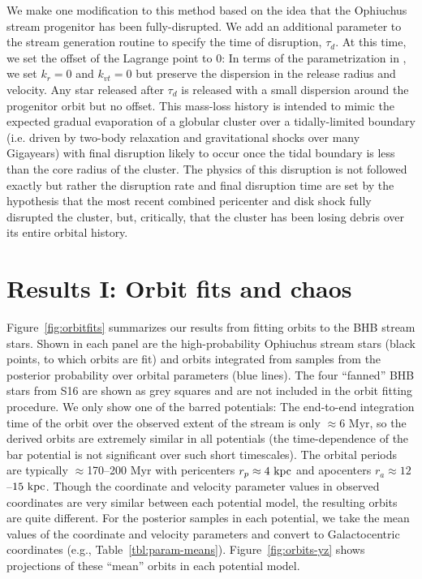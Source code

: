 We make one modification to this method based on the idea that the Ophiuchus
stream progenitor has been fully-disrupted. We add an additional parameter to
the stream generation routine to specify the time of disruption, $\tau_d$. At
this time, we set the offset of the Lagrange point to 0: In terms of the
parametrization in \citep{fardal14}, we set $k_r = 0$ and $k_{vt}=0$ but
preserve the dispersion in the release radius and velocity. Any star released
after $\tau_d$ is released with a small dispersion around the progenitor orbit
but no offset. This mass-loss history is intended to mimic the expected gradual
evaporation of a globular cluster over a tidally-limited boundary (i.e. driven
by two-body relaxation and gravitational shocks over many Gigayears) with final
disruption likely to occur once the tidal boundary is less than the core radius
of the cluster. The physics of this disruption is not followed exactly but
rather the disruption rate and final disruption time are set by the hypothesis
that the most recent combined pericenter and disk shock fully disrupted the
cluster, but, critically, that the cluster has been losing debris over its
entire orbital history.

\section{Results I: Orbit fits and chaos}\label{sec:results1}

Figure~\ref{fig:orbitfits} summarizes our results from fitting orbits to the BHB
stream stars. Shown in each panel are the high-probability Ophiuchus stream
stars (black points, to which orbits are fit) and orbits integrated from samples
from the posterior probability over orbital parameters (blue lines). The four
``fanned'' BHB stars from S16 are shown as grey squares and are not included in
the orbit fitting procedure. We only show one of the barred potentials: The
end-to-end integration time of the orbit over the observed extent of the stream
is only $\approx$6 Myr, so the derived orbits are extremely similar in all
potentials (the time-dependence of the bar potential is not significant over
such short timescales). The orbital periods are typically $\approx$170--200 Myr
with pericenters $r_p \approx 4~{\rm kpc}$ and apocenters $r_a \approx
12$--$15~{\rm kpc}$. Though the coordinate and velocity parameter values in
observed coordinates are very similar between each potential model, the
resulting orbits are quite different. For the posterior samples in each
potential, we take the mean values of the coordinate and velocity parameters and
convert to Galactocentric coordinates (e.g., Table~\ref{tbl:param-means}).
Figure~\ref{fig:orbits-yz} shows projections of these ``mean'' orbits in each
potential model.

